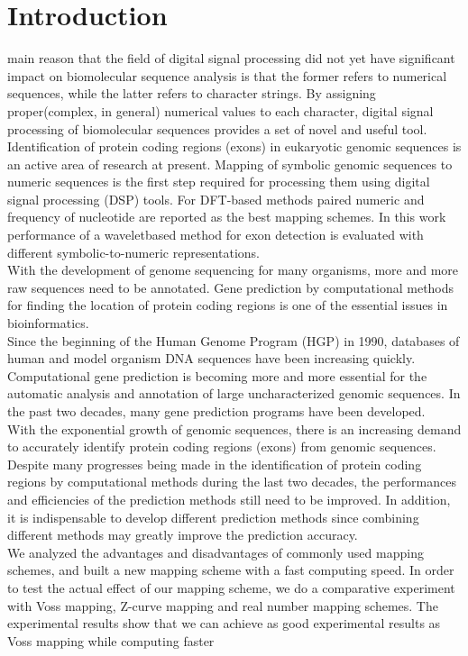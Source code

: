 \documentclass[conference]{IEEEtran}
\begin{document}
\section{Introduction}
 main reason that the field of digital signal processing did not yet have significant impact on biomolecular sequence analysis is that the former refers to numerical sequences, while the latter refers to character strings. By assigning proper(complex, in general) numerical values to each character, digital signal processing of biomolecular sequences provides a set of novel and useful tool.
~\\\indent Identification of protein coding regions (exons) in eukaryotic genomic sequences is an active area of research at present. Mapping of symbolic genomic sequences to numeric sequences is the first step required for processing them using digital signal processing (DSP) tools. For DFT-based methods paired numeric and frequency of nucleotide are reported as the best mapping schemes. In this work performance of a waveletbased method for exon detection is evaluated with different symbolic-to-numeric representations.
~\\\indent With the development of genome sequencing for many organisms, more and more raw sequences need to be annotated. Gene prediction by computational methods for finding the location of protein coding regions is one of the essential issues in bioinformatics.
~\\\indent Since the beginning of the Human Genome Program (HGP) in 1990, databases of human and model organism DNA sequences have been increasing quickly. Computational gene prediction is becoming more and more essential for the automatic analysis and annotation of large uncharacterized genomic sequences. In the past two decades, many gene prediction programs have been developed.
~\\\indent With the exponential growth of genomic sequences, there is an increasing demand to accurately identify protein coding regions (exons) from genomic sequences. Despite many progresses being made in the identification of protein coding regions by computational methods during the last two decades, the performances and efficiencies of the prediction methods still need to be improved. In addition, it is indispensable to develop different prediction methods since combining different methods may greatly improve the prediction accuracy.
~\\\indent We analyzed the advantages and disadvantages of commonly used mapping schemes, and built a new mapping scheme with a fast computing speed. In order to test the actual effect of our mapping scheme, we do a comparative experiment with Voss mapping, Z-curve mapping and real number mapping schemes. The experimental results show that we can achieve as good experimental results as Voss mapping while computing faster
\end{document}
